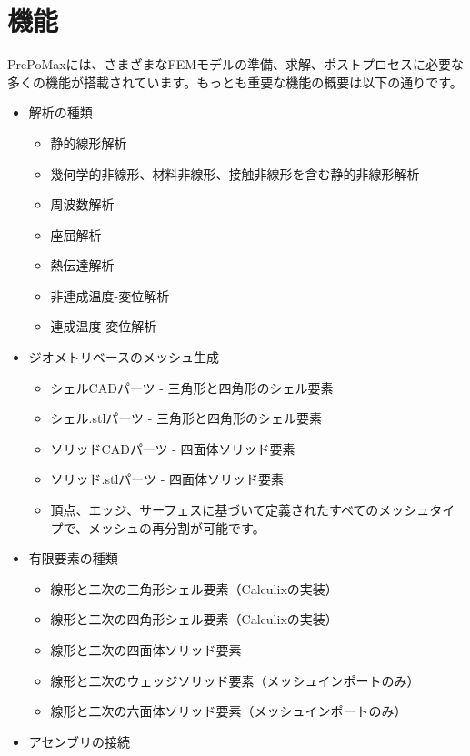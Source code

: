 \documentclass[a4j,20pt,slide]{ltjsarticle}
\begin{document}
\section{機能}\label{sec:2.0}
PrePoMaxには、さまざまなFEMモデルの準備、求解、ポストプロセスに必要な多くの機能が搭載されています。もっとも重要な機能の概要は以下の通りです。
\begin{itemize}
	\item 解析の種類
	      \begin{itemize}
		      \item 静的線形解析
		      \item 幾何学的非線形、材料非線形、接触非線形を含む静的非線形解析
		      \item 周波数解析
		      \item 座屈解析
		      \item 熱伝達解析
		      \item 非連成温度-変位解析
		      \item 連成温度-変位解析
	      \end{itemize}
	\item ジオメトリベースのメッシュ生成
	      \begin{itemize}
		      \item シェルCADパーツ - 三角形と四角形のシェル要素
		      \item シェル.stlパーツ - 三角形と四角形のシェル要素
		      \item ソリッドCADパーツ - 四面体ソリッド要素
		      \item ソリッド.stlパーツ - 四面体ソリッド要素
		      \item 頂点、エッジ、サーフェスに基づいて定義されたすべてのメッシュタイプで、メッシュの再分割が可能です。
	      \end{itemize}
	\item 有限要素の種類
	      \begin{itemize}
		      \item 線形と二次の三角形シェル要素（Calculixの実装）
		      \item 線形と二次の四角形シェル要素（Calculixの実装）
		      \item 線形と二次の四面体ソリッド要素
		      \item 線形と二次のウェッジソリッド要素（メッシュインポートのみ）
		      \item 線形と二次の六面体ソリッド要素（メッシュインポートのみ）
	      \end{itemize}
	\item アセンブリの接続
	      \begin{itemize}

\end{itemize}
\end{itemize}
\end{document}
